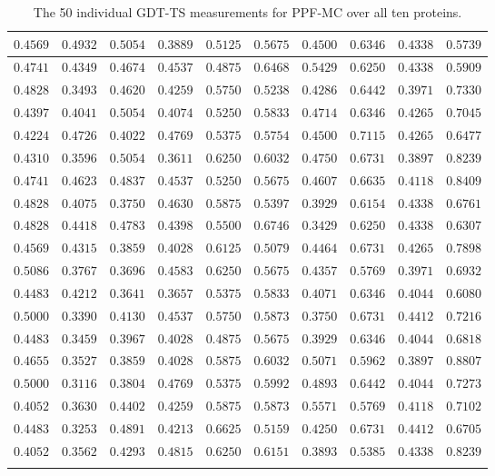 \begin{longtable}{c|c|c|c|c|c|c|c|c|c}
$0.4569$ & $0.4932$ & $0.5054$ & $0.3889$ & $0.5125$ & $0.5675$ & $0.4500$ & $0.6346$ & $0.4338$ & $0.5739$ \\ \hline
$0.4741$ & $0.4349$ & $0.4674$ & $0.4537$ & $0.4875$ & $0.6468$ & $0.5429$ & $0.6250$ & $0.4338$ & $0.5909$ \\ \hline
$0.4828$ & $0.3493$ & $0.4620$ & $0.4259$ & $0.5750$ & $0.5238$ & $0.4286$ & $0.6442$ & $0.3971$ & $0.7330$ \\ \hline
$0.4397$ & $0.4041$ & $0.5054$ & $0.4074$ & $0.5250$ & $0.5833$ & $0.4714$ & $0.6346$ & $0.4265$ & $0.7045$ \\ \hline
$0.4224$ & $0.4726$ & $0.4022$ & $0.4769$ & $0.5375$ & $0.5754$ & $0.4500$ & $0.7115$ & $0.4265$ & $0.6477$ \\ \hline
$0.4310$ & $0.3596$ & $0.5054$ & $0.3611$ & $0.6250$ & $0.6032$ & $0.4750$ & $0.6731$ & $0.3897$ & $0.8239$ \\ \hline
$0.4741$ & $0.4623$ & $0.4837$ & $0.4537$ & $0.5250$ & $0.5675$ & $0.4607$ & $0.6635$ & $0.4118$ & $0.8409$ \\ \hline
$0.4828$ & $0.4075$ & $0.3750$ & $0.4630$ & $0.5875$ & $0.5397$ & $0.3929$ & $0.6154$ & $0.4338$ & $0.6761$ \\ \hline
$0.4828$ & $0.4418$ & $0.4783$ & $0.4398$ & $0.5500$ & $0.6746$ & $0.3429$ & $0.6250$ & $0.4338$ & $0.6307$ \\ \hline
$0.4569$ & $0.4315$ & $0.3859$ & $0.4028$ & $0.6125$ & $0.5079$ & $0.4464$ & $0.6731$ & $0.4265$ & $0.7898$ \\ \hline
$0.5086$ & $0.3767$ & $0.3696$ & $0.4583$ & $0.6250$ & $0.5675$ & $0.4357$ & $0.5769$ & $0.3971$ & $0.6932$ \\ \hline
$0.4483$ & $0.4212$ & $0.3641$ & $0.3657$ & $0.5375$ & $0.5833$ & $0.4071$ & $0.6346$ & $0.4044$ & $0.6080$ \\ \hline
$0.5000$ & $0.3390$ & $0.4130$ & $0.4537$ & $0.5750$ & $0.5873$ & $0.3750$ & $0.6731$ & $0.4412$ & $0.7216$ \\ \hline
$0.4483$ & $0.3459$ & $0.3967$ & $0.4028$ & $0.4875$ & $0.5675$ & $0.3929$ & $0.6346$ & $0.4044$ & $0.6818$ \\ \hline
$0.4655$ & $0.3527$ & $0.3859$ & $0.4028$ & $0.5875$ & $0.6032$ & $0.5071$ & $0.5962$ & $0.3897$ & $0.8807$ \\ \hline
$0.5000$ & $0.3116$ & $0.3804$ & $0.4769$ & $0.5375$ & $0.5992$ & $0.4893$ & $0.6442$ & $0.4044$ & $0.7273$ \\ \hline
$0.4052$ & $0.3630$ & $0.4402$ & $0.4259$ & $0.5875$ & $0.5873$ & $0.5571$ & $0.5769$ & $0.4118$ & $0.7102$ \\ \hline
$0.4483$ & $0.3253$ & $0.4891$ & $0.4213$ & $0.6625$ & $0.5159$ & $0.4250$ & $0.6731$ & $0.4412$ & $0.6705$ \\ \hline
$0.4052$ & $0.3562$ & $0.4293$ & $0.4815$ & $0.6250$ & $0.6151$ & $0.3893$ & $0.5385$ & $0.4338$ & $0.8239$ \\ \hline
\caption{The 50 individual GDT-TS measurements for PPF-MC over all ten proteins.}
\end{longtable}


